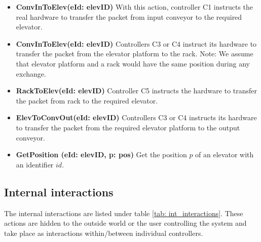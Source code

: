 \begin{itemize}
\item \textbf{ConvInToElev(eId: elevID)}
With this action, controller C1 instructs the real hardware to transfer the packet from input conveyor to the required elevator.

\item \textbf{ConvInToElev(eId: elevID)}
Controllers C3 or C4 instruct its hardware to transfer the packet from the elevator platform to the rack.
Note: We assume that elevator platform and a rack would have the same position during any exchange.

\item \textbf{RackToElev(eId: elevID)}
Controller C5 instructs the hardware to transfer the packet from rack to the required elevator.

\item \textbf{ElevToConvOut(eId: elevID)}
Controllers C3 or C4 instructs its hardware to transfer the packet from the required elevator platform to the output conveyor.

\item \textbf{GetPosition (eId: elevID, p: pos)}
Get the position $p$ of an elevator with an identifier $id$.

\end{itemize}

\subsection*{Internal interactions}
The internal interactions are listed under table \ref{tab: int_interactions}. These actions are hidden to the outside world or the user controlling the system and take place as interactions within/between individual controllers.


